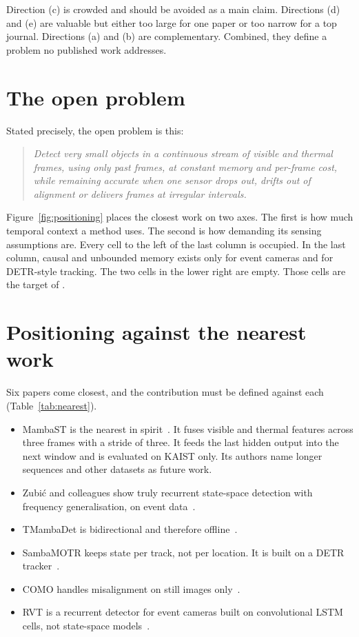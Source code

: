 Direction (c) is crowded and should be avoided as a main claim. Directions
(d) and (e) are valuable but either too large for one paper or too narrow
for a top journal. Directions (a) and (b) are complementary. Combined, they
define a problem no published work addresses.

\section{The open problem}
\label{sec:openproblem}

Stated precisely, the open problem is this:

\begin{quote}
\itshape
Detect very small objects in a continuous stream of visible and thermal
frames, using only past frames, at constant memory and per-frame cost, while
remaining accurate when one sensor drops out, drifts out of alignment or
delivers frames at irregular intervals.
\end{quote}

Figure~\ref{fig:positioning} places the closest work on two axes. The first
is how much temporal context a method uses. The second is how demanding its
sensing assumptions are. Every cell to the left of the last column is
occupied. In the last column, causal and unbounded memory exists only for
event cameras and for DETR-style tracking. The two cells in the lower right
are empty. Those cells are the target of \methodS{}.



\section{Positioning against the nearest work}
\label{sec:nearest}

Six papers come closest, and the contribution must be defined against each
(Table~\ref{tab:nearest}).
\begin{itemize}
  \item MambaST is the nearest in spirit~\citep{mambast2024}. It fuses
        visible and thermal features across three frames with a stride of
        three. It feeds the last hidden output into the next window and is
        evaluated on KAIST only. Its authors name longer sequences and other
        datasets as future work.
  \item Zubi\'c and colleagues show truly recurrent state-space detection
        with frequency generalisation, on event data~\citep{zubic2024ssmevent}.
  \item TMambaDet is bidirectional and therefore offline~\citep{tmambadet2026}.
  \item SambaMOTR keeps state per track, not per location. It is built on a
        DETR tracker~\citep{segu2025sambamotr}.
  \item COMO handles misalignment on still images only~\citep{como2024}.
  \item RVT is a recurrent detector for event cameras built on convolutional
        LSTM cells, not state-space models~\citep{gehrig2023rvt}.
\end{itemize}

